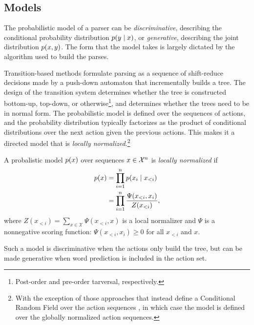   \subsection{Models}
    The probabilistic model of a parser can be \textit{discriminative}, describing the conditional probability distribution $p(y \mid x)$, or \textit{generative}, describing the joint distribution $p(x, y)$. The form that the model takes is largely dictated by the algorithm used to build the parses.

    Transition-based methods formulate parsing as a sequence of shift-reduce decisions made by a push-down automaton that incrementally builds a tree. The design of the transition system determines whether the tree is constructed bottom-up, top-down, or otherwise\footnote{Post-order and pre-order tarversal, respectively.}, and determines whether the trees need to be in normal form. The probabilistic model is defined over the sequences of actions, and the probability distribution typically factorizes as the product of conditional distributions over the next action given the previous actions. This makes it a directed model that is \textit{locally normalized}.\footnote{With the exception of those approaches that instead define a Conditional Random Field over the action sequences \citep{andor2016globally}, in which case the model is defined over the globally normalized action sequences.}
    \begin{definition}{}
      A probalistic model $p(x)$ over sequences $x \in \mathcal{X}^n$ is \textit{locally normalized} if
      \begin{align*}
        p(x)
          &= \prod_{i=1}^{n} p(x_i \mid x_{<i})  \\
          &= \prod_{i=1}^{n} \frac{ \Psi( x_{<i}, x_{i} ) }{ Z( x_{<i} ) },
      \end{align*}
      where $Z( x_{<i} ) = \sum_{x \in \mathcal{X}} \Psi( x_{<i}, x )$  is a local normalizer and $\Psi$ is a nonnegative scoring function: $\Psi( x_{<i}, x_{i} ) \geq 0$ for all $x_{<i}$ and $x$.
    \end{definition}
    Such a model is discriminative when the actions only build the tree, but can be made generative when word prediction is included in the action set.


